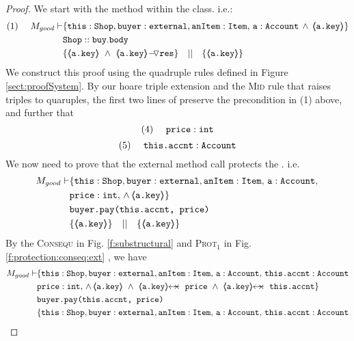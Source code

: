 \begin{proof}
We start with the  method within the  class. i.e.:
\small
\begin{align*}
\text{(1)}  \ \ \ \ M_{good} \vdash 
		&	\{  \prg{this}:\prg{Shop}, \prg{buyer} : \prg{external}, \prg{anItem} : \prg{Item},\, \prg{a}:\prg{Account}\,\wedge\, 
				{\inside{\prg{a.key}}} \} \\
		& \prg{Shop}::\prg{buy}.\prg{body}\ \\  
		& \{ {\inside{\prg{a.key}}}\ \wedge\ {\PushASLong {\prg{res}} {\inside{\prg{a.key}}}}  \} \ \ \  || \ \ \ 
		   \{ {\inside{\prg{a.key}}} \}
\end{align*}
\normalsize
We construct this proof using the quadruple rules defined in Figure \ref{sect:proofSystem}. By our hoare triple extension and the \textsc{Mid} rule that raises triples to quaruples, the first two lines
of \prg{buy} preserve the precondition in (1) above, and further that 
\small
$$
\text{(4)} \ \ \ \ \mbox{\normalfont{\texttt{price}}} : \mbox{\normalfont{\texttt{int}}}
$$ 
$$
\text{(5)} \ \ \ \ \prg{this.accnt} : \prg{Account}
$$ 
We now need to prove that the external method call  protects the . i.e.
\small
\begin{align*}
M_{good} \vdash & \{  \prg{this}:\prg{Shop}, \prg{buyer} : \prg{external}, \prg{anItem} : \prg{Item},\, \prg{a}:\prg{Account},\, \\
				& \prg{price} : \prg{int},\,
				  \wedge\, 
				  {\inside{\prg{a.key}}} \} \\
		  		& \prg{buyer.pay(this.accnt, price)}\ \\  
		  		& \{ {\inside{\prg{a.key}}}  \} \ \ \  || \ \ \ 
		  		   \{ {\inside{\prg{a.key}}} \}
\end{align*}
\normalsize
By the \textsc{Consequ} in Fig. \ref{f:substructural} and \textsc{Prot$_1$} in Fig. \ref{f:protection:conseq:ext} , we have
\small
\begin{align*}
M_{good} \vdash & \{  \prg{this}:\prg{Shop}, \prg{buyer} : \prg{external}, \prg{anItem} : \prg{Item},\, \prg{a}:\prg{Account},\, \prg{this.accnt}:\prg{Account}\\
				& \prg{price} : \prg{int},\,
				  \wedge\, 
				  {\inside{\prg{a.key}}}\ \wedge\ 
				  \protectedFrom{\prg{a.key}}{\prg{price}}\ \wedge\ 
				   \protectedFrom{\prg{a.key}}{\prg{this.accnt}}\} \\
		  		& \prg{buyer.pay(this.accnt, price)}\ \\  
		  		& \{  \prg{this}:\prg{Shop}, \prg{buyer} : \prg{external}, \prg{anItem} : \prg{Item},\, \prg{a}:\prg{Account},\, \prg{this.accnt}:\prg{Account}\\

\end{align*}
\end{proof}
